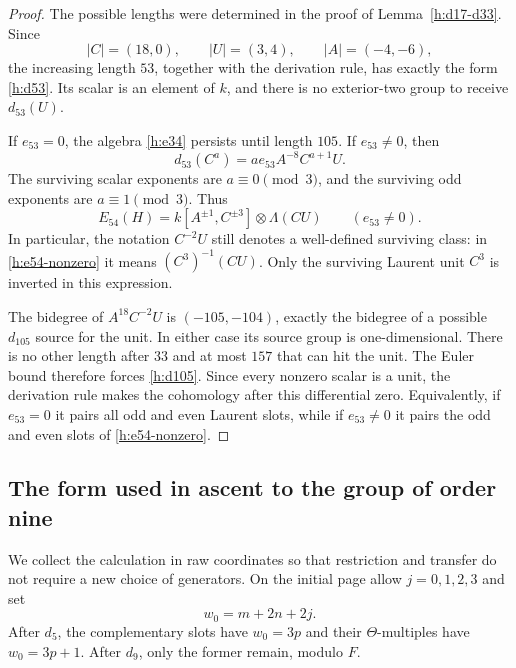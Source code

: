 \documentclass[11pt]{article}
\theoremstyle{definition}
\theoremstyle{remark}
\numberwithin{equation}{section}
\begin{document}
\begin{proof}
The possible lengths were determined in the proof of
Lemma~\ref{h:d17-d33}. Since
\[
 |C|=(18,0),\qquad |U|=(3,4),\qquad |A|=(-4,-6),
\]
the increasing length $53$, together with the derivation rule, has
exactly the form \eqref{h:d53}. Its scalar is an element of $k$, and
there is no exterior-two group to receive $d_{53}(U)$.

If $e_{53}=0$, the algebra \eqref{h:e34} persists until length
$105$. If $e_{53}\ne0$, then
\[
 d_{53}(C^a)=a e_{53}A^{-8}C^{a+1}U.
\]
The surviving scalar exponents are $a\equiv0\pmod3$, and the
surviving odd exponents are $a\equiv1\pmod3$. Thus
\begin{equation}
 \label{h:e54-nonzero}
 E_{54}(H)=k[A^{\pm1},C^{\pm3}]\otimes\Lambda(CU)
 \qquad(e_{53}\ne0).
\end{equation}
In particular, the notation $C^{-2}U$ still denotes a well-defined
surviving class: in \eqref{h:e54-nonzero} it means
$(C^3)^{-1}(CU)$. Only the surviving Laurent unit $C^3$ is inverted
in this expression.

The bidegree of $A^{18}C^{-2}U$ is $(-105,-104)$, exactly the
bidegree of a possible $d_{105}$ source for the unit. In either case
its source group is one-dimensional. There is no other length after
$33$ and at most $157$ that can hit the unit. The Euler bound
therefore forces \eqref{h:d105}. Since every nonzero scalar is a unit,
the derivation rule makes the cohomology after this differential zero.
Equivalently, if $e_{53}=0$ it pairs all odd and even Laurent slots,
while if $e_{53}\ne0$ it pairs the odd and even slots of
\eqref{h:e54-nonzero}.
\end{proof}

\subsection{The form used in ascent to the group of order nine}

We collect the calculation in raw coordinates so that restriction and
transfer do not require a new choice of generators. On the initial
page allow $j=0,1,2,3$ and set
\begin{equation}
 \label{h:w-coordinate}
 w_0=m+2n+2j.
\end{equation}
After $d_5$, the complementary slots have $w_0=3p$ and their
$\Theta$-multiples have $w_0=3p+1$. After $d_9$, only the former
remain, modulo $F$.
\end{document}
